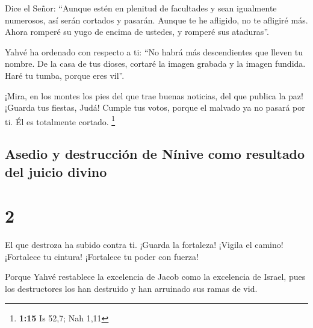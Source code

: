  Dice el Señor: ``Aunque estén en plenitud de facultades
y sean igualmente numerosos, así serán cortados y pasarán. Aunque te he
afligido, no te afligiré más.  Ahora romperé su yugo de
encima de ustedes, y romperé sus ataduras''.

 Yahvé ha ordenado con respecto a ti: ``No habrá más
descendientes que lleven tu nombre. De la casa de tus dioses, cortaré la
imagen grabada y la imagen fundida. Haré tu tumba, porque eres vil''.

 ¡Mira, en los montes los pies del que trae buenas
noticias, del que publica la paz! ¡Guarda tus fiestas, Judá! Cumple tus
votos, porque el malvado ya no pasará por ti. Él es totalmente cortado.
\footnote{\textbf{1:15} Is 52,7; Nah 1,11}

\hypertarget{asedio-y-destrucciuxf3n-de-nuxednive-como-resultado-del-juicio-divino}{%
\subsection{Asedio y destrucción de Nínive como resultado del juicio
divino}\label{asedio-y-destrucciuxf3n-de-nuxednive-como-resultado-del-juicio-divino}}

\hypertarget{section-1}{%
\section{2}\label{section-1}}

 El que destroza ha subido contra ti. ¡Guarda la
fortaleza! ¡Vigila el camino! ¡Fortalece tu cintura! ¡Fortalece tu poder
con fuerza!

 Porque Yahvé restablece la excelencia de Jacob como la
excelencia de Israel, pues los destructores los han destruido y han
arruinado sus ramas de vid.

